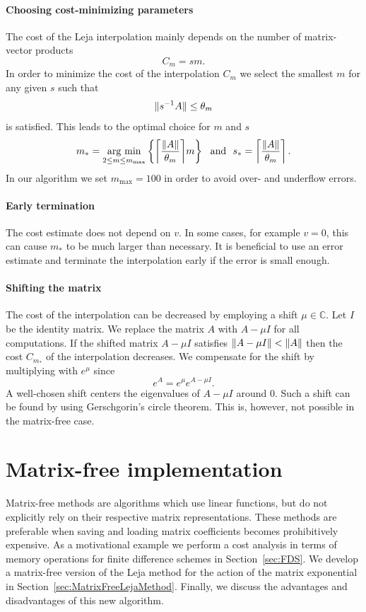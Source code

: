 \documentclass{scrartcl}
\begin{document}
	\paragraph{Choosing cost-minimizing parameters}
	The cost of the Leja interpolation mainly depends on the number of matrix-vector products
	\[
	C_{m} = sm. 
	\]
	In order to minimize the cost of the interpolation $C_m$ we select the smallest $m$ for any given $s$ such that
	\[
	\lVert s^{-1}A\rVert \le \theta_m
	\]
	is satisfied. This leads to the optimal choice for $m$ and $s$ 
	\begin{align}
	\begin{split}
	m_* = \underset{2\le m\le m_{\operatorname{max}}}{\operatorname{arg\ min}}  \left\{{\left\lceil{\frac{\norm{A}}{\theta_m}}\right\rceil}m\right\} ~~\text{and}~~
	s_* =  \left\lceil{\frac{\norm{A}}{\theta_m}}\right\rceil.
	\end{split} \label{eq:ms}
	\end{align}
	In our algorithm we set $m_{\operatorname{max}} = 100$ in order to avoid over- and underflow errors.
	
	\paragraph{Early termination}
	The cost estimate does not depend on $v$. In some cases, for example $v=0$, this can cause $m_*$ to be much larger than necessary. It is beneficial to use an error estimate and terminate the interpolation early if the error is small enough. 
	
	\paragraph{Shifting the matrix}
	The cost of the interpolation can be decreased by employing a shift $\mu\in\mathbb{C}$. Let $I$ be the identity matrix. We replace the matrix $A$ with $A-\mu I$ for all computations. If the shifted matrix $A-\mu I$ satisfies $\lVert A -\mu I\rVert < \lVert A\rVert$ then the cost $C_{m_*}$ of the interpolation decreases.
	We compensate for the shift by multiplying with $e^\mu$ since
	\[
	e^{A} = e^{\mu}e^{A-\mu I}.
	\]
	A well-chosen shift centers the eigenvalues of $A-\mu I$ around $0$. Such a shift can be found by using Gerschgorin's circle theorem. This is, however, not possible in the matrix-free case.
	 
	
	
\section{Matrix-free implementation}\label{sec:matrixfreeimplementation}
	Matrix-free methods are algorithms which use linear functions, but do not explicitly rely on their respective matrix representations. These methods are preferable when saving and loading matrix coefficients becomes prohibitively expensive. As a motivational example we perform a cost analysis in terms of memory operations for finite difference schemes in Section~\ref{sec:FDS}.
	We develop a matrix-free version of the Leja method for the action of the matrix exponential in Section~\ref{sec:MatrixFreeLejaMethod}. Finally, we discuss the advantages and disadvantages of this new algorithm.
\end{document}

